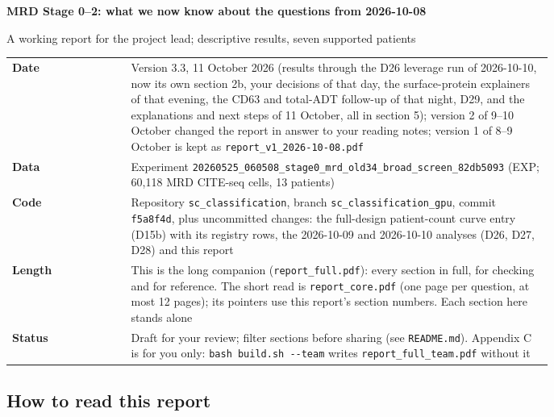 \documentclass[11pt]{article}
\begin{document}
\thispagestyle{plain}
\begin{flushleft}
{\LARGE\bfseries MRD Stage 0--2: what we now know about the questions from 2026-10-08\par}
\vspace{6pt}
{\large\color{inkmuted} A working report for the project lead; descriptive results, seven supported patients\par}
\vspace{10pt}
{\small
\begin{tabular}{@{}l@{\hspace{1em}}p{0.78\linewidth}@{}}
\textbf{Date} & Version 3.3, 11 October 2026 (results through the D26 leverage run of 2026-10-10, now its own section 2b, your decisions of that day, the surface-protein explainers of that evening, the CD63 and total-ADT follow-up of that night, D29, and the explanations and next steps of 11 October, all in section 5); version 2 of 9--10 October changed the report in answer to your reading notes; version 1 of 8--9 October is kept as \texttt{report\_v1\_2026-10-08.pdf} \\
\textbf{Data} & Experiment \nolinkurl{20260525_060508_stage0_mrd_old34_broad_screen_82db5093} (EXP; 60,118 MRD CITE-seq cells, 13 patients) \\
\textbf{Code} & Repository \texttt{sc\_classification}, branch \texttt{sc\_classification\_gpu}, commit \texttt{f5a8f4d}, plus uncommitted changes: the full-design patient-count curve entry (D15b) with its registry rows, the 2026-10-09 and 2026-10-10 analyses (D26, D27, D28) and this report \\
\textbf{Length} & This is the long companion (\texttt{report\_full.pdf}): every section in full, for checking and for reference. The short read is \texttt{report\_core.pdf} (one page per question, at most 12 pages); its pointers use this report's section numbers. Each section here stands alone \\
\textbf{Status} & Draft for your review; filter sections before sharing (see \texttt{README.md}). Appendix C is for you only: \texttt{bash build.sh -{}-team} writes \texttt{report\_full\_team.pdf} without it \\
\end{tabular}\par}
\end{flushleft}
\vspace{4pt}

\subsection*{How to read this report}
\end{document}
